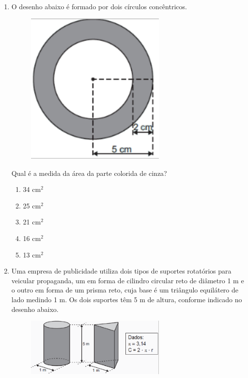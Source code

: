 \documentclass[twocolumn,oneside,a4paper,12.0pt]{article}
\begin{document}
\begin{enumerate}

\item O desenho abaixo é formado por dois círculos concêntricos.  

	\begin{figure}[!htb]
	\center
	\includegraphics[width=7cm]{Extras/a4.png}
	\end{figure}

Qual é a medida da área da parte colorida de cinza?

\begin{enumerate}
\item 34 cm$^2$
\item 25 cm$^2$
\item 21 cm$^2$
\item 16 cm$^2$
\item 13 cm$^2$ 
\end{enumerate}


\item Uma empresa de publicidade utiliza dois tipos de suportes rotatórios para veicular propaganda, um em forma de cilindro circular reto de diâmetro 1 m e o outro em forma de um prisma reto, cuja base é um triângulo equilátero de lado medindo 1 m. Os dois suportes têm 5 m de altura, conforme indicado no desenho abaixo.

	\begin{figure}[!htb]
	\center
	\includegraphics[width=7cm]{Extras/a5.png}
	\end{figure}


\end{enumerate}
\end{document}
